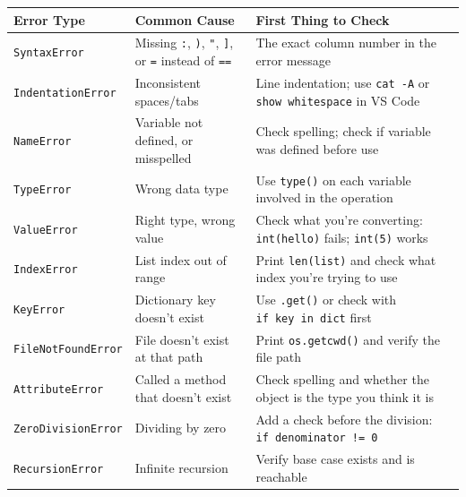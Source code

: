 \documentclass[
  justified,
  openright,
]{tufte-book}
\begin{document}
\begin{fullwidth}{\def\LTcaptype{none} %
\begin{longtable}[]{@{}
  >{\raggedright\arraybackslash}p{}
  >{\raggedright\arraybackslash}p{}
  >{\raggedright\arraybackslash}p{}@{}}
\toprule\noalign{}
\begin{minipage}[b]{\linewidth}\raggedright
Error Type
\end{minipage} & \begin{minipage}[b]{\linewidth}\raggedright
Common Cause
\end{minipage} & \begin{minipage}[b]{\linewidth}\raggedright
First Thing to Check
\end{minipage} \\
\midrule\noalign{}
\endhead
\bottomrule\noalign{}
\endlastfoot
\texttt{SyntaxError} & Missing \texttt{:}, \texttt{)}, \texttt{"},
\texttt{{]}}, or \texttt{=} instead of \texttt{==} & The exact column
number in the error message \\
\texttt{IndentationError} & Inconsistent spaces/tabs & Line indentation;
use \texttt{cat\ -A} or \texttt{show\ whitespace} in VS Code \\
\texttt{NameError} & Variable not defined, or misspelled & Check
spelling; check if variable was defined before use \\
\texttt{TypeError} & Wrong data type & Use \texttt{type()} on each
variable involved in the operation \\
\texttt{ValueError} & Right type, wrong value & Check what you're
converting: \texttt{int(\textquotesingle{}hello\textquotesingle{})}
fails; \texttt{int(\textquotesingle{}5\textquotesingle{})} works \\
\texttt{IndexError} & List index out of range & Print \texttt{len(list)}
and check what index you're trying to use \\
\texttt{KeyError} & Dictionary key doesn't exist & Use \texttt{.get()}
or check with \texttt{if\ key\ in\ dict} first \\
\texttt{FileNotFoundError} & File doesn't exist at that path & Print
\texttt{os.getcwd()} and verify the file path \\
\texttt{AttributeError} & Called a method that doesn't exist & Check
spelling and whether the object is the type you think it is \\
\texttt{ZeroDivisionError} & Dividing by zero & Add a check before the
division: \texttt{if\ denominator\ !=\ 0} \\
\texttt{RecursionError} & Infinite recursion & Verify base case exists
and is reachable \\
\end{longtable}
}
\end{fullwidth}
\end{document}
